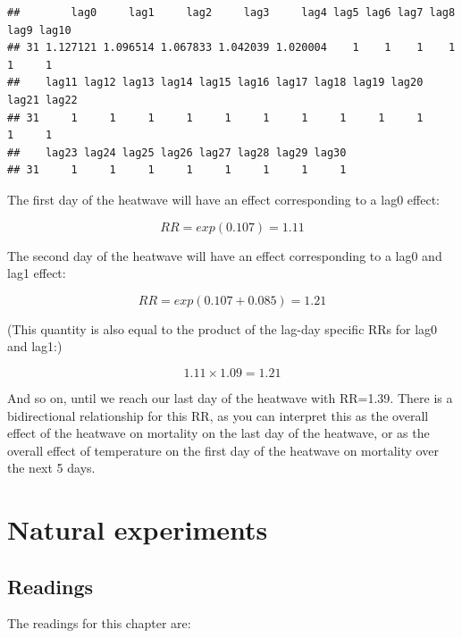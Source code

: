 \documentclass[
]{book}
\begin{document}
\begin{verbatim}
##        lag0     lag1     lag2     lag3     lag4 lag5 lag6 lag7 lag8 lag9 lag10
## 31 1.127121 1.096514 1.067833 1.042039 1.020004    1    1    1    1    1     1
##    lag11 lag12 lag13 lag14 lag15 lag16 lag17 lag18 lag19 lag20 lag21 lag22
## 31     1     1     1     1     1     1     1     1     1     1     1     1
##    lag23 lag24 lag25 lag26 lag27 lag28 lag29 lag30
## 31     1     1     1     1     1     1     1     1
\end{verbatim}

The first day of the heatwave will have an effect corresponding to a lag0 effect:

\[
RR=exp(0.107)=1.11
\]

The second day of the heatwave will have an effect corresponding to a lag0 and lag1 effect:

\[
RR = exp(0.107 + 0.085) = 1.21
\]

(This quantity is also equal to the product of the lag-day specific RRs for lag0 and lag1:)

\[
1.11 \times 1.09 = 1.21
\]

And so on, until we reach our last day of the heatwave with RR=1.39. There is a bidirectional relationship for this RR, as you can interpret this as the overall effect of the heatwave on mortality on the last day of the heatwave, or as the overall effect of temperature on the first day of the heatwave on mortality over the next 5 days.

\hypertarget{natural-experiments}{%
\chapter{Natural experiments}\label{natural-experiments}}

\hypertarget{readings-2}{%
\section{Readings}\label{readings-2}}

The readings for this chapter are:
\end{document}
